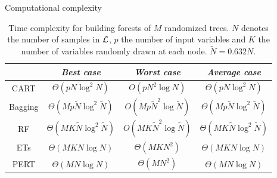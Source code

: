 \documentclass{beamer}
\begin{document}
\begin{frame}{Computational complexity}

\begin{table}
    \centering
    \begin{tabular}{| c | c c c |}
    \hline
         & \textit{Best case} & \textit{Worst case} & \textit{Average case}  \\
    \hline
    \hline
    CART & $\Theta(pN\log^2 N)$ & $O(pN^2\log N)$ & $\Theta(pN\log^2 N)$ \\
    Bagging & $\Theta(Mp\widetilde{N}\log^2 \widetilde{N})$ & $O(Mp\widetilde{N}^2\log \widetilde{N})$ & $\Theta(Mp\widetilde{N}\log^2 \widetilde{N})$  \\
    RF & $\Theta(MK\widetilde{N}\log^2 \widetilde{N})$ & $O(MK\widetilde{N}^2\log \widetilde{N})$ & $\Theta(MK\widetilde{N}\log^2 \widetilde{N})$  \\
    ETs & $\Theta(MKN\log N)$ & $\Theta(MKN^2)$ & $\Theta(MKN\log N)$  \\
    PERT & $\Theta(MN\log N)$ & $\Theta(MN^2)$ & $\Theta(MN\log N)$  \\
    \hline
    \end{tabular}
    \caption{Time complexity for building forests of $M$ randomized trees. $N$ denotes the number of samples in ${\cal L}$, $p$ the number of input variables and $K$ the number of variables randomly drawn at each node. $\widetilde{N} = 0.632 N$.}
    \label{table:complexity-fit}
\end{table}

\end{frame}
\end{document}
